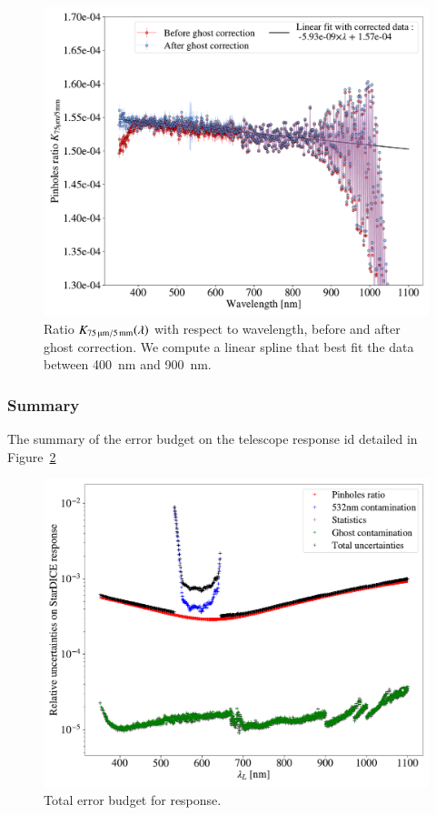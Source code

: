 \begin{figure}[h]
    \centering
    \includegraphics[width=\columnwidth]{fig/ratio_pinholes.pdf}
    \caption{Ratio $K_\mathrm{\SI{75}{\micro\meter}/\SI{5}{\milli\meter}}(\lambda)$ with respect to wavelength, before and after ghost correction. We compute a linear spline that best fit the data between \SI{400}{\nm} and \SI{900}{\nm}.}
    \label{fig:ratio_pinholes}
\end{figure}

\subsubsection{Summary}

The summary of the error budget on the \SD telescope response id detailed in Figure~\ref{fig:sd_budget}


\begin{figure}
    \centering
    \includegraphics[width=\columnwidth]{fig/sd_uncertainties_budget.pdf}
    \caption{Total error budget for \SD response.}
    \label{fig:sd_budget}
\end{figure}


